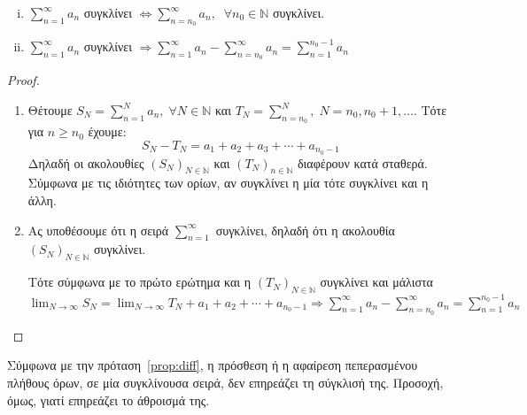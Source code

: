 \begin{mybox3}
\begin{prop}
  \begin{enumerate}[i)]
    \mbox{}
    \item $ \sum_{n=1}^{\infty} a_{n}  $ συγκλίνει 
      $ \Leftrightarrow \sum_{n= n_{0}}^{\infty} a_{n}, \; \; \forall n_{0} 
      \in \mathbb{N}  $ συγκλίνει.
    \item\label{prop:diff2} $ \sum_{n=1}^{\infty} a_{n}  $ συγκλίνει 
      $ \Rightarrow \sum_{n=1}^{\infty} a_{n} - \sum_{n= n_{0}}^{\infty} a_{n}  
      = \sum_{n=1}^{n_{0}-1} a_{n} $
  \end{enumerate}
  \label{prop:diff}
\end{prop}
\end{mybox3}
\begin{proof}
\item {}
    \begin{enumerate}
        \item Θέτουμε $ S_{N} = \sum_{n=1}^{N} a_{n}, \; 
            \forall N \in \mathbb{N} $ και $ T_{N} = \sum_{n= n_{0}}^{N}, \; N= n_{0}, 
            n_{0}+1, \ldots $. Τότε για $ n \geq n_{0} $ έχουμε:
            \[
                S_{N}-T_{N} = a_{1}+ a_{2}+ a_{3}+ \cdots + a_{n_0-1} 
            \] 
            Δηλαδή οι ακολουθίες $ (S_{N})_{N \in \mathbb{N}} $ και 
            $ (T_{N})_{n \in \mathbb{N}} $ διαφέρουν κατά σταθερά. Σύμφωνα 
            με τις ιδιότητες των ορίων, αν συγκλίνει η μία τότε συγκλίνει και η άλλη.

        \item Ας υποθέσουμε ότι η σειρά $ \sum_{n=1}^{\infty} $ συγκλίνει, 
            δηλαδή ότι η ακολουθία $ (S_{N})_{N \in \mathbb{N}} $ συγκλίνει. 

            Τότε σύμφωνα με το πρώτο ερώτημα και η $ (T_{N})_{N \in \mathbb{N}} $
            συγκλίνει και μάλιστα $ \lim_{N \to \infty} S_{N} = \lim_{N \to \infty} 
            T_{N} + a_{1}+ a_{2} + \cdots + a_{n_{0}-1} 
            \Rightarrow \sum_{n=1}^{\infty} a_{n}- \sum_{n= n_{0}}^{\infty} a_{n} = 
            \sum_{n=1}^{n_{0}-1} a_{n}    $
    \end{enumerate}
\end{proof}

\begin{rem}
  Σύμφωνα με την  πρόταση~\ref{prop:diff}, η πρόσθεση ή η αφαίρεση πεπερασμένου 
  πλήθους όρων, σε μία συγκλίνουσα σειρά, δεν επηρεάζει τη σύγκλισή της. Προσοχή, όμως,
  γιατί επηρεάζει το άθροισμά της.
\end{rem}


